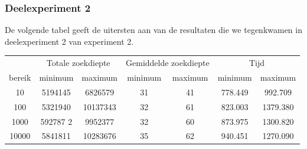 \documentclass[a4paper,10pt]{article}
\begin{document}
\subsubsection{Deelexperiment 2}
De volgende tabel geeft de uitersten aan van de resultaten die we tegenkwamen in deelexperiment 2 van experiment 2. \\

\begin{center}
\begin{tabular}{c c c c c c c}
 & \multicolumn{2}{c}{Totale zoekdiepte} & \multicolumn{2}{c}{Gemiddelde zoekdiepte} & \multicolumn{2}{c}{Tijd}\\ 
bereik & minimum & maximum & minimum & maximum & minimum & maximum \\
10 & 5194145 & 6826579 & 31 &  41 & 778.449 & 992.709 \\
100 & 5321940 & 10137343 & 32 & 61 & 823.003 & 1379.380 \\
1000 & 592787 2& 9952377 & 32 & 60 & 873.975 & 1300.820 \\
10000 & 5841811 & 10283676 & 35 & 62 & 940.451 & 1270.090 \\
\end{tabular}
\end{center}
\end{document}

